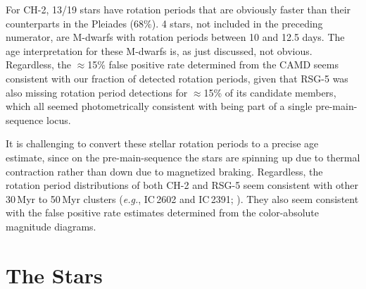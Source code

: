 \documentclass[12pt,twocolumn,linenumbers]{aastex63}
\begin{document}
%
%
%

For CH-2, 13/19 stars have rotation periods that are obviously faster
than their counterparts in the Pleiades (68\%).  4 stars, not included
in the preceding numerator, are M-dwarfs with rotation periods between
10 and 12.5 days.  The age interpretation for these M-dwarfs is, as
just discussed, not obvious.  Regardless, the $\approx$15\% false
positive rate determined from the CAMD seems consistent with our
fraction of detected rotation periods, given that RSG-5 was also
missing rotation period detections for $\approx$15\% of its candidate
members, which all seemed photometrically consistent with being part
of a single pre-main-sequence locus.

It is challenging to convert these stellar rotation periods
to a precise age estimate, since on the pre-main-sequence
the stars are spinning up due to thermal contraction
rather than down due to magnetized braking.  Regardless, the rotation
period distributions of both CH-2 and RSG-5 seem consistent with other
30\,Myr to 50\,Myr clusters ({\it e.g.}, IC\,2602 and IC\,2391;
\citealt{douglas_stephanie_t_2021_5131306}).
They also seem consistent with the false positive rate estimates
determined from the color-absolute magnitude diagrams.


\section{The Stars}
\label{sec:stars}
\end{document}
